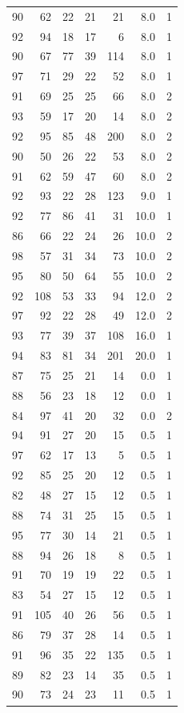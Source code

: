 \documentclass[
  11pt,
  a4paper,
]{scrartcl}
\begin{document}
\begin{longtable}[]{@{}rrrrrrl@{}}
90 & 62 & 22 & 21 & 21 & 8.0 & 1 \\
92 & 94 & 18 & 17 & 6 & 8.0 & 1 \\
90 & 67 & 77 & 39 & 114 & 8.0 & 1 \\
97 & 71 & 29 & 22 & 52 & 8.0 & 1 \\
91 & 69 & 25 & 25 & 66 & 8.0 & 2 \\
93 & 59 & 17 & 20 & 14 & 8.0 & 2 \\
92 & 95 & 85 & 48 & 200 & 8.0 & 2 \\
90 & 50 & 26 & 22 & 53 & 8.0 & 2 \\
91 & 62 & 59 & 47 & 60 & 8.0 & 2 \\
92 & 93 & 22 & 28 & 123 & 9.0 & 1 \\
92 & 77 & 86 & 41 & 31 & 10.0 & 1 \\
86 & 66 & 22 & 24 & 26 & 10.0 & 2 \\
98 & 57 & 31 & 34 & 73 & 10.0 & 2 \\
95 & 80 & 50 & 64 & 55 & 10.0 & 2 \\
92 & 108 & 53 & 33 & 94 & 12.0 & 2 \\
97 & 92 & 22 & 28 & 49 & 12.0 & 2 \\
93 & 77 & 39 & 37 & 108 & 16.0 & 1 \\
94 & 83 & 81 & 34 & 201 & 20.0 & 1 \\
87 & 75 & 25 & 21 & 14 & 0.0 & 1 \\
88 & 56 & 23 & 18 & 12 & 0.0 & 1 \\
84 & 97 & 41 & 20 & 32 & 0.0 & 2 \\
94 & 91 & 27 & 20 & 15 & 0.5 & 1 \\
97 & 62 & 17 & 13 & 5 & 0.5 & 1 \\
92 & 85 & 25 & 20 & 12 & 0.5 & 1 \\
82 & 48 & 27 & 15 & 12 & 0.5 & 1 \\
88 & 74 & 31 & 25 & 15 & 0.5 & 1 \\
95 & 77 & 30 & 14 & 21 & 0.5 & 1 \\
88 & 94 & 26 & 18 & 8 & 0.5 & 1 \\
91 & 70 & 19 & 19 & 22 & 0.5 & 1 \\
83 & 54 & 27 & 15 & 12 & 0.5 & 1 \\
91 & 105 & 40 & 26 & 56 & 0.5 & 1 \\
86 & 79 & 37 & 28 & 14 & 0.5 & 1 \\
91 & 96 & 35 & 22 & 135 & 0.5 & 1 \\
89 & 82 & 23 & 14 & 35 & 0.5 & 1 \\
90 & 73 & 24 & 23 & 11 & 0.5 & 1 \\

\end{longtable}
\end{document}
